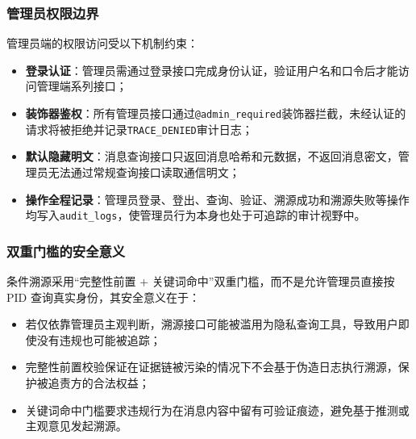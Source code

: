 \subsubsection*{管理员权限边界}

管理员端的权限访问受以下机制约束：

\begin{itemize}[leftmargin=2em]
  \item \textbf{登录认证}：管理员需通过登录接口完成身份认证，验证用户名和口令后才能访问管理端系列接口；
  \item \textbf{装饰器鉴权}：所有管理员接口通过\texttt{@admin\_required}装饰器拦截，未经认证的请求将被拒绝并记录\texttt{TRACE\_DENIED}审计日志；
  \item \textbf{默认隐藏明文}：消息查询接口只返回消息哈希和元数据，不返回消息密文，管理员无法通过常规查询接口读取通信明文；
  \item \textbf{操作全程记录}：管理员登录、登出、查询、验证、溯源成功和溯源失败等操作均写入\texttt{audit\_logs}，使管理员行为本身也处于可追踪的审计视野中。
\end{itemize}

\subsubsection*{双重门槛的安全意义}

条件溯源采用“完整性前置 + 关键词命中”双重门槛，而不是允许管理员直接按 PID 查询真实身份，其安全意义在于：

\begin{itemize}[leftmargin=2em]
  \item 若仅依靠管理员主观判断，溯源接口可能被滥用为隐私查询工具，导致用户即使没有违规也可能被追踪；
  \item 完整性前置校验保证在证据链被污染的情况下不会基于伪造日志执行溯源，保护被追责方的合法权益；
  \item 关键词命中门槛要求违规行为在消息内容中留有可验证痕迹，避免基于推测或主观意见发起溯源。
\end{itemize}
